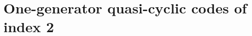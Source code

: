 \documentclass[a4paper,12pt]{article}
\begin{document}





 
\section{One-generator quasi-cyclic codes of index 2}

\end{document}
